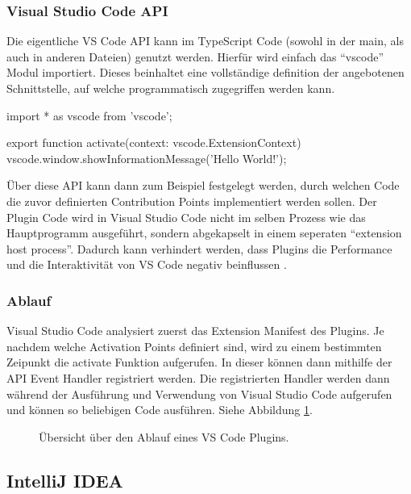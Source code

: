 \subsubsection{Visual Studio Code API} 
  Die eigentliche VS Code API kann im TypeScript Code (sowohl in der main, 
  als auch in anderen Dateien) genutzt werden. Hierfür wird einfach das \enquote{vscode}
  Modul importiert. Dieses beinhaltet eine vollständige definition der angebotenen
  Schnittstelle, auf welche programmatisch zugegriffen werden kann.
  \begin{JsCode}
    import * as vscode from 'vscode';

    export function activate(context: vscode.ExtensionContext) {
      vscode.window.showInformationMessage('Hello World!');
    }
  \end{JsCode}
  Über diese API kann dann zum Beispiel festgelegt werden, durch welchen Code
  die zuvor definierten Contribution Points implementiert werden sollen.
  Der Plugin Code wird in Visual Studio Code nicht im selben Prozess wie das
  Hauptprogramm ausgeführt, sondern abgekapselt in einem seperaten 
  \enquote{extension host process}. Dadurch kann verhindert werden, dass
  Plugins die Performance und die Interaktivität von VS Code negativ beinflussen 
  \cite{VSCodeArchitecture,VSCodeApproachToExtensibility}.
\subsubsection{Ablauf}
  Visual Studio Code analysiert zuerst das Extension Manifest des Plugins.
  Je nachdem welche Activation Points definiert sind, wird zu einem
  bestimmten Zeipunkt die activate Funktion aufgerufen. In dieser 
  können dann mithilfe der API Event Handler registriert werden. 
  Die registrierten Handler werden dann während der Ausführung und Verwendung
  von Visual Studio Code aufgerufen und können so beliebigen Code ausführen.
  Siehe Abbildung \ref{fig:diagram_VSCodeExtensionArchitecture}.
  \begin{figure}
    \centering
    \caption{Übersicht über den Ablauf eines VS Code Plugins.}
    \label{fig:diagram_VSCodeExtensionArchitecture}
  \end{figure}   

\subsection{IntelliJ IDEA}

